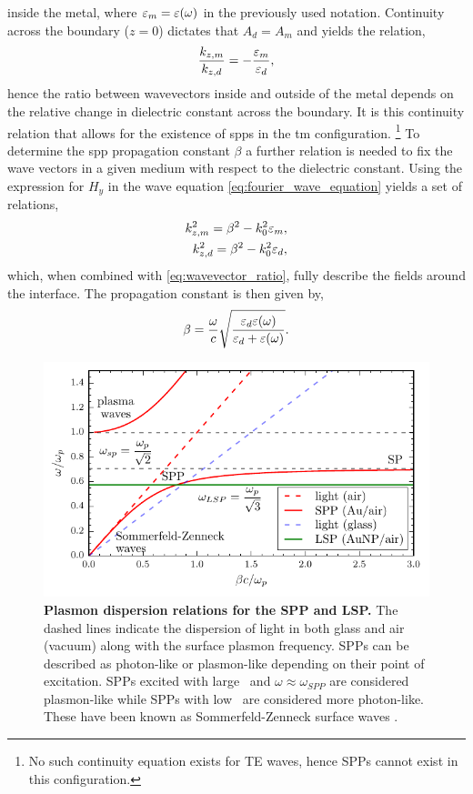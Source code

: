 \documentclass{article}
\begin{document}
inside the metal, where $\varepsilon_m=\varepsilon(\omega)$ in the previously used notation. Continuity across the boundary ($z=0$) dictates that $A_d=A_m$ and yields the relation,
\begin{equation}
	\frac{k_{z,m}}{k_{z,d}} = -\frac{\varepsilon_m}{\varepsilon_d},
	\label{eq:wavevector_ratio}
\end{equation}
hence the ratio between wavevectors inside and outside of the metal depends on the relative change in dielectric constant across the boundary. It is this continuity relation that allows for the existence of \glspl{spp} in the \gls{tm} configuration.%
\footnote{No such continuity equation exists for TE waves, hence SPPs cannot exist in this configuration.}
To determine the \gls{spp} propagation constant $\beta$ a further relation is needed to fix the wave vectors in a given medium with respect to the dielectric constant. Using the expression for $H_y$ in the wave equation \eqref{eq:fourier_wave_equation} yields a set of relations,
\begin{subequations}
\begin{align}
	k_{z,m}^2 = \beta^2 - k_0^2\varepsilon_m,\\
	k_{z,d}^2 = \beta^2 - k_0^2\varepsilon_d,
\end{align}
\end{subequations}
which, when combined with \eqref{eq:wavevector_ratio}, fully describe the fields around the interface. The propagation constant is then given by,
\begin{equation}
	\beta = \frac{\omega}{c}\sqrt{\frac{\varepsilon_d\varepsilon(\omega)}{\varepsilon_d + \varepsilon(\omega)}}.
	\label{eq:spp_dispersion}
\end{equation}
\begin{figure}[bt]
\centering
\includegraphics{figures/spp_dispersion}
\caption[Plasmon dispersion relations for the SPP and LSP]{\textbf{Plasmon dispersion relations for the SPP and LSP.} The dashed lines indicate the dispersion of light in both glass and air (vacuum) along with the surface plasmon frequency. SPPs can be described as photon-like or plasmon-like depending on their point of excitation. SPPs excited with large \wvm\ and $\omega\approx\omega_{SPP}$ are considered plasmon-like while SPPs with low \wvm\ are considered more photon-like. These have been known as Sommerfeld-Zenneck surface waves \cite{kittel1976introduction}.}
\label{fig:spp_dispersion}
\end{figure}
\end{document}
